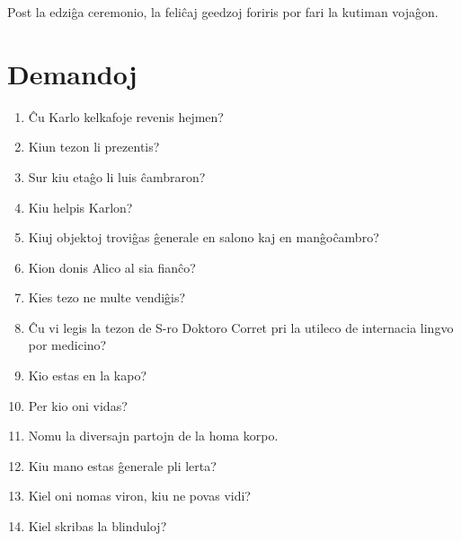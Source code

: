 Post la edziĝa ceremonio, la feliĉaj geedzoj foriris por fari la kutiman vojaĝon.

\newpage

\section*{Demandoj}

\begin{enumerate}
    \item  Ĉu Karlo kelkafoje revenis hejmen?
    \item  Kiun tezon li prezentis?
    \item  Sur kiu etaĝo li luis ĉambraron?
    \item  Kiu helpis Karlon?
    \item  Kiuj objektoj troviĝas ĝenerale en salono kaj en manĝoĉambro?
    \item  Kion donis Alico al sia fianĉo?
    \item  Kies tezo ne multe vendiĝis?
    \item  Ĉu vi legis la tezon de S-ro Doktoro Corret pri la utileco de internacia lingvo por medicino?
    \item  Kio estas en la kapo?
    \item  Per kio oni vidas?
    \item  Nomu la diversajn partojn de la homa korpo.
    \item  Kiu mano estas ĝenerale pli lerta?
    \item  Kiel oni nomas viron, kiu ne povas vidi?
    \item  Kiel skribas la blinduloj?
\end{enumerate}
